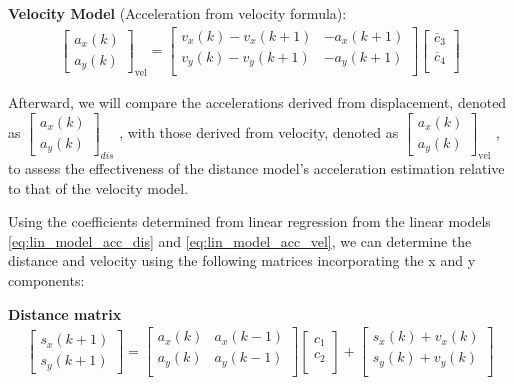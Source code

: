 \textbf{Velocity Model} (Acceleration from velocity formula):
\begin{align} \label{eq:lin_model_acc_vel}
    \begin{bmatrix}
        a_x(k) \\ 
        a_y(k) 
    \end{bmatrix}_{\text{vel}}
    =
    \begin{bmatrix}
        v_x(k) - v_x(k+1) & -a_x(k+1)    \\ 
        v_y(k) - v_y(k+1) & -a_y(k+1)    \\
    \end{bmatrix}
    \begin{bmatrix}
        \overline{c}_3 \\
        \overline{c}_4 \\
   \end{bmatrix}
\end{align}

\hfil

Afterward, we will compare the accelerations derived from displacement, denoted as 
$\begin{bmatrix} a_x(k) \\ a_y(k) \end{bmatrix}_{dis}$
, with those derived from velocity, denoted as 
$\begin{bmatrix} a_x(k) \\ a_y(k) \end{bmatrix}_{\text{vel}}$
, to assess the effectiveness of the distance model's acceleration estimation relative to that of the velocity model.


Using the coefficients determined from linear regression from the linear models \eqref{eq:lin_model_acc_dis} and \eqref{eq:lin_model_acc_vel}, we can determine the distance and velocity using the following matrices incorporating the x and y components:

\hfil

\textbf{Distance matrix}
{\footnotesize
\begin{align}
\label{eq:distance_matrix}
    \begin{bmatrix}
        s_x(k+1) \\ 
        s_y(k+1) 
    \end{bmatrix}
    =
    \begin{bmatrix}
        a_x(k) & a_x(k-1)    \\ 
        a_y(k) & a_y(k-1)    \\
    \end{bmatrix}
    \begin{bmatrix}
        c_1 \\
        c_2 \\
    \end{bmatrix}
    +
    \begin{bmatrix}
        s_x(k) + v_x(k) \\ 
        s_y(k) + v_y(k) \\
    \end{bmatrix}
\end{align} 
}


